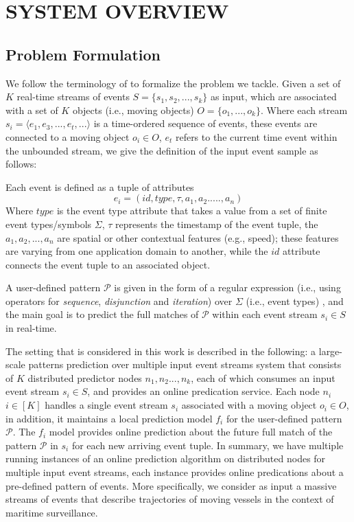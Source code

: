 \section{SYSTEM OVERVIEW}
\label{sec:system}
\subsection{Problem Formulation}

We follow the terminology of \cite{luckham2008power,alevizos2015complex,zhou2015pattern} to formalize the problem we tackle. Given a set of \emph{$K$} real-time streams of events $S = \{ s_1,s_2, ..., s_k\}$ as input, which are associated with a set of \emph{$K$}  objects (i.e., moving objects) $O = \{ o_1, ..., o_k\}$. Where each stream $s_i=\langle e_1,e_3,...,e_t,...\rangle$  is a time-ordered sequence of events, these events are connected to a moving object  $o_i \in O$,  $e_t$  refers to the current time event within the unbounded stream, we give the definition of the input event sample as follows:  
\begin{definition}
	Each event is defined as a tuple of attributes $$e_i = (id,type,\tau,a_1,a_2.....,a_n)$$ Where $type$ is the event type attribute that takes a value from a set of finite event types/symbols $\Sigma$, $\tau$ represents the timestamp of the event tuple,  the  $a_1,a_2,...,a_n$ are spatial or other contextual features (e.g., speed); these features are varying from one application domain to another, while the $id$ attribute connects the event tuple to an associated object.
\end{definition}

\par A user-defined pattern $\mathcal{P}$ is given in the form of a regular expression (i.e., using operators for \textit{sequence}, \textit{disjunction} and \textit{iteration}) over $\Sigma$ (i.e., event types) \cite{alevizos2017event}, and the main goal is to predict the full matches of $\mathcal{P}$ within each event stream $s_i\in S$ in real-time.

\par The setting that is considered in this work is described in the following:
a large-scale patterns prediction over multiple input event streams system that  consists of $K$ distributed predictor nodes $n_1,n_2...,n_k$, each of which consumes an input event stream $s_i\in S$, and provides an online predication service. Each node $n_i$ $ i \in [K]$ handles a single event stream $s_i$ associated with a moving object $o_i \in O$, in addition,  it  maintains a local prediction model $f_i$ for the user-defined pattern $\mathcal{P}$. The $f_i$ model provides online prediction about the future full match of the pattern $\mathcal{P}$ in $s_i$  for each new arriving event tuple. In summary, we have multiple running instances of an online prediction algorithm on distributed nodes for multiple input event streams, each instance provides online predications about a pre-defined pattern of events. More specifically,  we consider as input a massive streams of events  that describe trajectories of moving vessels in the context of maritime surveillance.  

